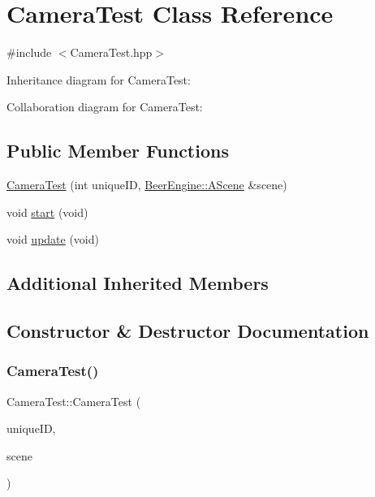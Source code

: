 \hypertarget{class_camera_test}{}\section{Camera\+Test Class Reference}
\label{class_camera_test}


{\ttfamily \#include $<$Camera\+Test.\+hpp$>$}



Inheritance diagram for Camera\+Test\+:


Collaboration diagram for Camera\+Test\+:
\subsection*{Public Member Functions}
\begin{DoxyCompactItemize}
\item 
\mbox{\hyperlink{class_camera_test_a87bcce0ea69a1a731e9e7743ecff602f}{Camera\+Test}} (int unique\+ID, \mbox{\hyperlink{class_beer_engine_1_1_a_scene}{Beer\+Engine\+::\+A\+Scene}} \&scene)
\item 
void \mbox{\hyperlink{class_camera_test_a33618b16d2906b67b68e55ad15a8a33b}{start}} (void)
\item 
void \mbox{\hyperlink{class_camera_test_a5bacc3399e57aa311e8d5ea39c9865bf}{update}} (void)
\end{DoxyCompactItemize}
\subsection*{Additional Inherited Members}


\subsection{Constructor \& Destructor Documentation}
\mbox{\label{class_camera_test_a87bcce0ea69a1a731e9e7743ecff602f}} 
\subsubsection{\texorpdfstring{Camera\+Test()}{CameraTest()}}
{\footnotesize\ttfamily Camera\+Test\+::\+Camera\+Test (\begin{DoxyParamCaption}\item[{int}]{unique\+ID,  }\item[{\mbox{\hyperlink{class_beer_engine_1_1_a_scene}{Beer\+Engine\+::\+A\+Scene}} \&}]{scene }\end{DoxyParamCaption})}




